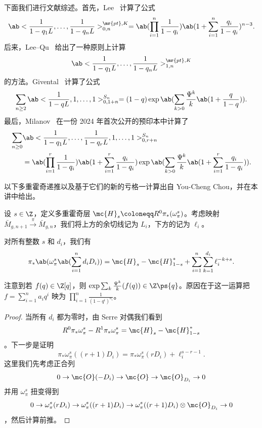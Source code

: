 下面我们进行文献综述。首先，Lee~\cite{Lee1997} 计算了公式
\[ \ab<\frac{1}{1-q_1 L}, \ldots, \frac{1}{1-q_n L}>_{0,n}^{\mr{pt}, K} = \ab(\prod_{i=1}^n \frac{1}{1-q_i}) \ab(1 + \sum_{i=1}^n \frac{q_i}{1-q_i})^{n-3}. \]
后来，Lee--Qu~\cite{LeeQu2014} 给出了一种原则上计算
\[ \ab<\frac{1}{1-q_1 L}, \ldots, \frac{1}{1-q_n L}>_{1,n}^{\mr{pt}, K} \]
的方法。Givental~\cite{Givental2017K1} 计算了公式
\[ \sum_{n \geq 2} \ab<\frac{1}{1-q L}, 1, \ldots, 1>_{0,1+n}^{S_n} = (1-q) \exp\ab(\sum_{k > 0} \frac{\Psi^k}{k} \ab(1 + \frac{q}{1-q})). \]
最后，Milanov~\cite{Milanov2025} 在一份 2024 年首次公开的预印本中计算了
\begin{align*}
    \sum_{n \geq 0}& \ab<\frac{1}{1-q_1 L}, \ldots, \frac{1}{1-q_r L}, 1, \ldots, 1>_{0,r+n}^{S_n} \\
    &= \ab(\prod_{i=1}^{r} \frac{1}{1-q_i})\ab(1 + \sum_{i=1}^r \frac{q_i}{1-q_i}) \exp\ab(\sum_{k > 0} \frac{\Psi^k}{k} \ab(1 + \sum_{i=1}^r \frac{q_i}{1-q_i})). 
\end{align*}

以下多重霍奇递推以及基于它们的新的亏格一计算出自 You-Cheng Chou，并在本讲中给出。

设 \(s \in \Z\)，定义多重霍奇层 \(\mc{H}_s \coloneqq R^0 \pi_* (\omega_{\pi}^s)\)。考虑映射 \(\bar{M}_{g,n+1} \xrightarrow{\pi} \bar{M}_{g,n}\)，我们将上方的余切线记为 \(L_i\)，下方的记为 \(\ell_i\)。

\begin{lem}
    对所有整数 \(s\) 和 \(d_i\)，我们有
    \[ \pi_*\ab(\omega_{\pi}^s\ab(\sum_{i=1}^n d_i D_i)) = \mc{H}_s-\mc{H}_{1-s}^* + \sum_{i=1}^n \sum_{k=1}^{d_i} \ell_i^{-k+s}. \]
\end{lem}

\begin{rmk}
    注意到若 \(f(q) \in \Z[q]\)，则 \(\exp \sum_k \frac{\Psi^k}{k} (f(q)) \in \Z \ps{q}\)。原因在于这一运算把 \(f = \sum_{i=1}^{n} a_i q^i\) 映为 \(\prod_{i=1}^n \frac{1}{(1-q^i)^{a_i}}\)。
\end{rmk}

\begin{proof}
    当所有 \(d_i\) 都为零时，由 Serre 对偶我们看到
    \[ R^0 \pi_* \omega_{\pi}^s - R^1 \pi_* \omega_{\pi}^s = \mc{H}_s - \mc{H}_{1-s}^* \]
    。下一步是证明
    \[ \pi_* \omega_{\pi}^s ((r+1)D_i) = \pi_* \omega_{\pi}^s(r D_i) + \ell_i^{s-r-1}. \]
    这里我们先考虑正合列
    \[ 0 \to \mc{O} (-D_i) \to \mc{O} \to \mc{O}_{D_i} \to 0 \]
    并用 \(\omega_{\pi}^s\) 扭变得到
    \[ 0 \to \omega_{\pi}^s(r D_i) \to \omega_{\pi}^s ((r+1)D_i) \to \omega_{\pi}^s ((r+1)D_i) \otimes \mc{O}_{D_i} \to 0 \]
    ，然后计算前推。
\end{proof}

